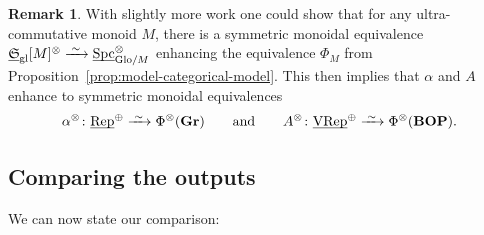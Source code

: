 \documentclass[reqno]{memo-l}
\theoremstyle{mythm}
\theoremstyle{definition}
\newtheorem{rk}[thm]{Remark}
\numberwithin{equation}{section}
\newcommand{\gl}{\textup{gl}}
\DeclareMathOperator{\Spc}{Spc}
\newcommand{\cat}[1]{\textbf{\textup{#1}}}
\newcommand{\Glo}{\textup{Glo}}
\newcommand{\ulhelper}[2]{\underline{\setbox0=\hbox{$#1#2$}\dp0=0.4pt \box0\relax}}
\newcommand{\ul}[1]{{\mathpalette\ulhelper{#1}}\hbox{\rule[-2pt]{0pt}{0pt}}}
\newcommand{\iso}{\xrightarrow{\;\smash{\raisebox{-0.25ex}{\ensuremath{\scriptstyle\sim}}}\;}}
\newcommand{\myS}{{{\mathfrak S\kern-.4pt}}}
\newcommand{\VRep}{\textup{VRep}}
\newcommand{\Vect}{\textup{Rep}}
\newcommand{\BOP}{\cat{BOP}}
\newcommand{\Gr}{\cat{Gr}}
\begin{document}
\begin{rk}
        With slightly more work one could show that for any ultra-commutative monoid $M$, there is a symmetric monoidal equivalence $\ul\myS_{\gl}[M]^{\otimes}\iso \ul{\Spc}_{\Glo/M}^{\otimes}$ enhancing the equivalence $\Phi_M$ from Proposition~\ref{prop:model-categorical-model}. This then implies that $\alpha$ and $A$ enhance to symmetric monoidal equivalences \[\alpha^{\otimes}\colon \ul\Vect^{\oplus}\iso\Phi^{\otimes}(\Gr)\qquad\text{and}\qquad A^{\otimes}\colon \ul\VRep^{\oplus}\iso \Phi^{\otimes}(\BOP).\]   
\end{rk}

\subsection{Comparing the outputs} We can now state our comparison:
\end{document}
